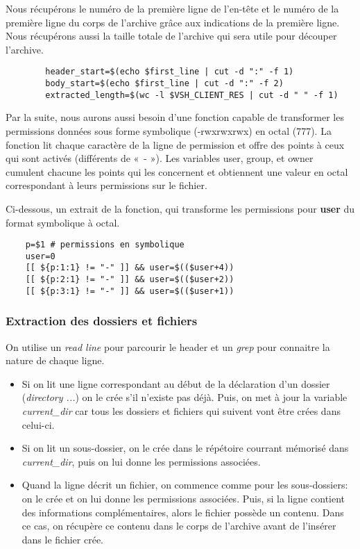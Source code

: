 \documentclass[titlepage]{article}
\begin{document}
	Nous récupérons le numéro de la première ligne de l'en-tête et le numéro de la première ligne du corps de l'archive grâce aux indications de la première ligne. Nous récupérons aussi la taille totale de l’archive qui sera utile pour découper l'archive.

	\begin{lstlisting}
		header_start=$(echo $first_line | cut -d ":" -f 1)
		body_start=$(echo $first_line | cut -d ":" -f 2) 
		extracted_length=$(wc -l $VSH_CLIENT_RES | cut -d " " -f 1)
	\end{lstlisting}

	Par la suite, nous aurons aussi besoin d’une fonction capable de transformer les permissions données sous forme symbolique (-rwxrwxrwx) en octal (777). La fonction lit chaque caractère de la ligne de permission et offre des points à ceux qui sont activés (différents de « - »). Les variables user, group, et owner cumulent chacune les points qui les concernent et obtiennent une valeur en octal correspondant à leurs permissions sur le fichier. 

	Ci-dessous, un extrait de la fonction, qui transforme les permissions pour \textbf{user} du format symbolique à octal.

	\begin{lstlisting}
	p=$1 # permissions en symbolique
	user=0
	[[ ${p:1:1} != "-" ]] && user=$(($user+4))
	[[ ${p:2:1} != "-" ]] && user=$(($user+2))
	[[ ${p:3:1} != "-" ]] && user=$(($user+1))
	\end{lstlisting}

	\subsubsection{Extraction des dossiers et fichiers}

	On utilise un \textit{read line} pour parcourir le header et un \textit{grep} pour connaitre la nature de chaque ligne.
	\begin{itemize}
		\item Si on lit une ligne correspondant au début de la déclaration d'un dossier (\textit{directory ...}) on le crée s’il n’existe pas déjà. Puis, on met à jour la variable \textit{current\_dir} car tous les dossiers et fichiers qui suivent vont être crées dans celui-ci.
		\item Si on lit un sous-dossier, on le crée dans le répétoire courrant mémorisé dans \textit{current\_dir}, puis on lui donne les permissions associées. 
		\item Quand la ligne décrit un fichier, on commence comme pour les sous-dossiers: on le crée et on lui donne les permissions associées. Puis, si la ligne contient des informations complémentaires, alors le fichier possède un contenu. Dans ce cas, on récupère ce contenu dans le corps de l'archive avant de l'insérer dans le fichier crée.
	\end{itemize}
\end{document}
